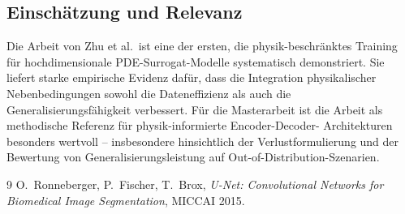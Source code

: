 \documentclass[a4paper,12pt]{article}
\begin{document}
\subsection*{Einschätzung und Relevanz}

Die Arbeit von Zhu et al.\ ist eine der ersten, die physik-beschränktes Training für
hochdimensionale PDE-Surrogat-Modelle systematisch demonstriert. Sie liefert starke
empirische Evidenz dafür, dass die Integration physikalischer Nebenbedingungen sowohl
die Dateneffizienz als auch die Generalisierungsfähigkeit verbessert. Für die
Masterarbeit ist die Arbeit als methodische Referenz für physik-informierte Encoder-Decoder-
Architekturen besonders wertvoll -- insbesondere hinsichtlich der Verlustformulierung und
der Bewertung von Generalisierungsleistung auf Out-of-Distribution-Szenarien.

\begin{thebibliography}{9}
O.~Ronneberger, P.~Fischer, T.~Brox,
\emph{U-Net: Convolutional Networks for Biomedical Image Segmentation},
MICCAI 2015.
\end{thebibliography}
\end{document}
